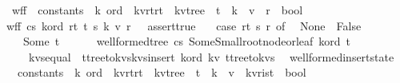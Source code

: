\begin{isabellebody}
\ wf{\isacharunderscore}f\ {\isacharcolon}{\isacharcolon}\ {\isachardoublequoteopen}constants\ {\isasymRightarrow}\ {\isacharprime}k\ ord\ {\isasymRightarrow}\ {\isacharparenleft}{\isacharprime}k{\isacharcomma}{\isacharprime}v{\isacharcomma}{\isacharprime}r{\isacharcomma}{\isacharprime}t{\isacharparenright}r{}t\ {\isasymRightarrow}\ {\isacharparenleft}{\isacharprime}k{\isacharcomma}{\isacharprime}v{\isacharparenright}tree\ {\isasymRightarrow}\ {\isacharprime}t\ {\isasymRightarrow}\ {\isacharprime}k\ {\isasymRightarrow}\ {\isacharprime}v\ {\isasymRightarrow}\ {\isacharprime}r\ {\isasymRightarrow}\ bool{\isachardoublequoteclose}\ \isanewline
{\isachardoublequoteopen}wf{\isacharunderscore}f\ cs\ k{\isacharunderscore}ord\ r{}t\ t{}\ s\ k\ v\ r\ {\isacharequal}\ \ assert{\isacharunderscore}true\ {\isacharparenleft}\isanewline
\ \ case\ r{}t\ s\ r\ of\isanewline
\ \ None\ {\isasymRightarrow}\ False\isanewline
\ \ {\isacharbar}\ Some\ t{\isacharprime}\ {\isasymRightarrow}\ {\isacharparenleft}\isanewline
\ \ \ \ wellformed{\isacharunderscore}tree\ cs\ {\isacharparenleft}Some{\isacharparenleft}Small{\isacharunderscore}root{\isacharunderscore}node{\isacharunderscore}or{\isacharunderscore}leaf{\isacharparenright}{\isacharparenright}\ k{\isacharunderscore}ord\ t{\isacharprime}\ {\isacharampersand}\isanewline
\ \ \ \ kvs{\isacharunderscore}equal\ {\isacharparenleft}\ {\isacharparenleft}t{}{\isacharbar}{\isachargreater}tree{\isacharunderscore}to{\isacharunderscore}kvs{\isacharbar}{\isachargreater}kvs{\isacharunderscore}insert\ k{\isacharunderscore}ord\ {\isacharparenleft}k{\isacharcomma}v{\isacharparenright}{\isacharparenright}{\isacharparenright}\ {\isacharparenleft}t{\isacharprime}{\isacharbar}{\isachargreater}tree{\isacharunderscore}to{\isacharunderscore}kvs{\isacharparenright}\ {\isacharparenright}{\isacharparenright}{\isachardoublequoteclose}\isanewline
\isanewline
\isanewline
{}\isamarkupfalse%
\ wellformed{\isacharunderscore}insert{\isacharunderscore}state\ {\isacharcolon}{\isacharcolon}\ \isanewline
\ \ {\isachardoublequoteopen}constants\ {\isasymRightarrow}\ {\isacharprime}k\ ord\ {\isasymRightarrow}\ {\isacharparenleft}{\isacharprime}k{\isacharcomma}{\isacharprime}v{\isacharcomma}{\isacharprime}r{\isacharcomma}{\isacharprime}t{\isacharparenright}r{}t\ {\isasymRightarrow}\ {\isacharparenleft}{\isacharprime}k{\isacharcomma}{\isacharprime}v{\isacharparenright}tree\ {\isasymRightarrow}\ {\isacharprime}t\ {\isasymRightarrow}\ {\isacharprime}k\ {\isasymRightarrow}\ {\isacharprime}v\ {\isasymRightarrow}\ {\isacharparenleft}{\isacharprime}k{\isacharcomma}{\isacharprime}v{\isacharcomma}{\isacharprime}r{\isacharparenright}ist\ {\isasymRightarrow}\ bool{\isachardoublequoteclose}\ \isanewline

\end{isabellebody}
